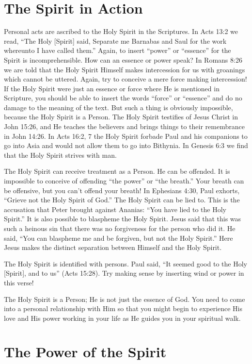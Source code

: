 \section*{The Spirit in Action}

Personal acts are ascribed to the Holy Spirit in the Scriptures.
In Acts 13:2 we read, “The Holy [Spirit] said, Separate
me Barnabas and Saul for the work whereunto I have
called them.” Again, to insert “power” or “essence” for the
Spirit is incomprehensible. How can an essence or power
speak? In Romans 8:26 we are told that the Holy Spirit Himself
makes intercession for us with groanings which cannot
be uttered. Again, try to conceive a mere force making intercession!
If the Holy Spirit were just an essence or force
where He is mentioned in Scripture, you should be able to
insert the words “force” or “essence” and do no damage
to the meaning of the text. But such a thing is obviously
impossible, because the Holy Spirit is a Person. The Holy
Spirit testifies of Jesus Christ in John 15:26, and He teaches
the believers and brings things to their remembrance in
John 14:26. In Acts 16:2, 7 the Holy Spirit forbade Paul and
his companions to go into Asia and would not allow them
to go into Bithynia. In Genesis 6:3 we find that the Holy
Spirit strives with man.

The Holy Spirit can receive treatment as a Person. He
can be offended. It is impossible to conceive of offending
“the power” or “the breath.” Your breath can be offensive,
but you can’t offend your breath! In Ephesians 4:30, Paul
exhorts, “Grieve not the Holy Spirit of God.” The Holy
Spirit can be lied to. This is the accusation that Peter brought
against Ananias: “You have lied to the Holy Spirit.” It is also
possible to blaspheme the Holy Spirit. Jesus said that this
was such a heinous sin that there was no forgiveness for the
person who did it. He said, “You can blaspheme me and be
forgiven, but not the Holy Spirit.” Here Jesus makes the distinct
separation between Himself and the Holy Spirit.

The Holy Spirit is identified with persons. Paul said, “It
seemed good to the Holy [Spirit], and to us” (Acts 15:28).
Try making sense by inserting wind or power in this verse!

The Holy Spirit is a Person; He is not just the essence
of God. You need to come into a personal relationship with
Him so that you might begin to experience His love and His
power working in your life as He guides you in your spiritual
walk.


\section*{The Power of the Spirit}


